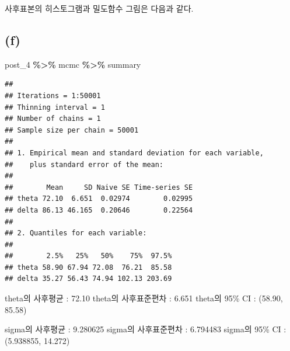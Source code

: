 \documentclass[
]{article}
\newenvironment{Shaded}{\begin{snugshade}}{\end{snugshade}}
\newcommand{\NormalTok}[1]{#1}
\newcommand{\SpecialCharTok}[1]{\textcolor[rgb]{0.81,0.36,0.00}{\textbf{#1}}}
\begin{document}
사후표본의 히스토그램과 밀도함수 그림은 다음과 같다.

\subsection{(f)}\label{f}

\begin{Shaded}
\begin{Highlighting}[]
\NormalTok{post\_4 }\SpecialCharTok{\%\textgreater{}\%}\NormalTok{ mcmc }\SpecialCharTok{\%\textgreater{}\%}\NormalTok{ summary}
\end{Highlighting}
\end{Shaded}

\begin{verbatim}
## 
## Iterations = 1:50001
## Thinning interval = 1 
## Number of chains = 1 
## Sample size per chain = 50001 
## 
## 1. Empirical mean and standard deviation for each variable,
##    plus standard error of the mean:
## 
##        Mean     SD Naive SE Time-series SE
## theta 72.10  6.651  0.02974        0.02995
## delta 86.13 46.165  0.20646        0.22564
## 
## 2. Quantiles for each variable:
## 
##        2.5%   25%   50%    75%  97.5%
## theta 58.90 67.94 72.08  76.21  85.58
## delta 35.27 56.43 74.94 102.13 203.69
\end{verbatim}

theta의 사후평균 : 72.10 theta의 사후표준편차 : 6.651 theta의 95\% CI :
(58.90, 85.58)

sigma의 사후평균 : 9.280625 sigma의 사후표준편차 : 6.794483 sigma의 95\%
CI : (5.938855, 14.272)
\end{document}
